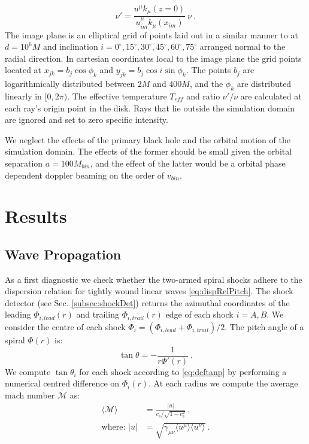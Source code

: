 \documentclass{emulateapj}
\begin{document}
\begin{equation}
	\nu' = \frac{u^\mu k_\mu(z=0)}{u^\mu_{im} k_\mu(x_{im})} \ \nu \ .
\end{equation}
The image plane is an elliptical grid of points laid out in a similar manner to \cite{Kulkarni11} at $d=10^6M$ and inclination $i = 0^\circ, 15^\circ, 30^\circ, 45^\circ, 60^\circ, 75^\circ$ arranged normal to the radial direction.  In cartesian coordinates local to the image plane the grid points located at $x_{jk} = b_j \cos \phi_k$ and $y_{jk} = b_j \cos i \sin \phi_k$.  The points $b_j$ are logarithmically distributed between $2M$ and $400M$, and the  $\phi_k$ are distributed linearly in $[0, 2\pi)$. The effective temperature $T_{eff}$ and ratio $\nu' / \nu$ are calculated at each ray's origin point in the disk.  Rays that lie outside the simulation domain are ignored and set to zero specific intensity.

We neglect the effects of the primary black hole and the orbital motion of the simulation domain.  The effects of the former should be small given the orbital separation $a = 100M_{bin}$, and the effect of the latter would be a orbital phase dependent doppler beaming on the order of $v_{bin}$.



\section{Results}
\label{sec:results}

\subsection{Wave Propagation}
\label{subsec:res-prop}

As a first diagnostic we check whether the two-armed spiral shocks adhere to the dispersion relation for tightly wound linear waves \eqref{eq:dispRelPitch}.  The shock detector (see Sec. \ref{subsec:shockDet}) returns the azimuthal coordinates of the leading $\Phi_{i,lead}(r)$ and trailing $\Phi_{i,trail}(r)$ edge of each shock $i=A,B$.  We consider the centre of each shock $\Phi_i = (\Phi_{i,lead} + \Phi_{i,trail}) / 2$.  The pitch angle of a spiral $\Phi(r)$ is:
\begin{equation}
	\tan \theta = -\frac{1}{r \Phi'(r)} \ . \label{eq:deftanp} 
\end{equation}
We compute $\tan \theta_i$ for each shock according to \eqref{eq:deftanp} by performing a numerical centred difference on $\Phi_i(r)$.  At each radius we compute the average mach number $\mathcal{M}$ as:
\begin{align}
	\langle \mathcal{M} \rangle &=  \frac{|u|}{c_s / \sqrt{1-c_s^2}} \ , \\
	\text{where: } |u| &= \sqrt{\gamma_{\mu\nu} \langle u^\mu \rangle  \langle u^\nu \rangle} \nonumber \ .
\end{align}
\end{document}
